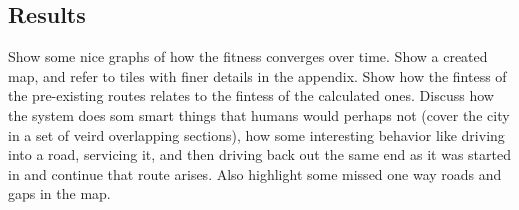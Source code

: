 \subsection{Results}
Show some nice graphs of how the fitness converges over time.
Show a created map, and refer to tiles with finer details in the appendix.
Show how the fintess of the pre-existing routes relates to the fintess of the calculated ones.
Discuss how the system does som smart things that humans would perhaps not (cover the city in a set of veird overlapping sections), how some interesting behavior like driving into a road, servicing it, and then driving back out the same end as it was started in and continue that route arises. Also highlight some missed one way roads and gaps in the map.


\cleardoublepage
